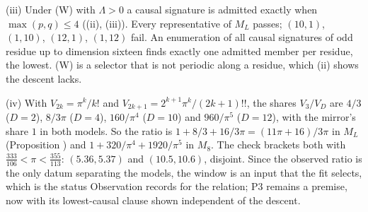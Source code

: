 (iii) Under (W) with $\Lambda > 0$ a causal signature is admitted exactly when $\max(p,q) \le 4$ ((ii), (iii)). Every representative of $M_{L}$ passes; $(10,1)$, $(1,10)$, $(12,1)$, $(1,12)$ fail. An enumeration of all causal signatures of odd residue up to dimension sixteen finds exactly one admitted member per residue, the lowest. (W) is a selector that is not periodic along a residue, which (ii) shows the descent lacks.

(iv) With $V_{2k} = \pi^{k}/k!$ and $V_{2k+1} = 2^{k+1}\pi^{k}/(2k+1)!!$, the shares $V_{3}/V_{D}$ are $4/3$ ($D = 2$), $8/3\pi$ ($D = 4$), $160/\pi^{4}$ ($D = 10$) and $960/\pi^{5}$ ($D = 12$), with the mirror's share $1$ in both models. So the ratio is $1 + 8/3 + 16/3\pi = (11\pi + 16)/3\pi$ in $M_{L}$ (Proposition ) and $1 + 320/\pi^{4} + 1920/\pi^{5}$ in $M_{8}$. The check brackets both with $\tfrac{333}{106} < \pi < \tfrac{355}{113}$: $(5.36, 5.37)$ and $(10.5, 10.6)$, disjoint. Since the observed ratio is the only datum separating the models, the window is an input that the fit selects, which is the status Observation  records for the relation; P3 remains a premise, now with its lowest-causal clause shown independent of the descent.
